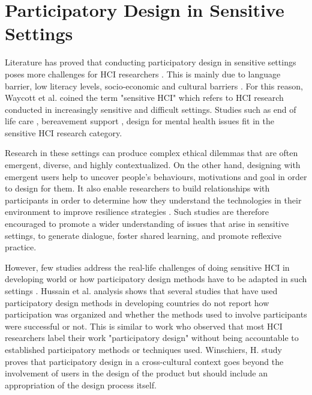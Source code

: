 \section{Participatory Design in Sensitive Settings}
Literature has proved that conducting participatory design in sensitive settings poses more challenges for HCI researchers \citep{Hussain2012, Wadley2016, Garzotto2008}. This is mainly due to language barrier, low literacy levels, socio-economic and cultural barriers \citep{Hussain2012}. For this reason, Waycott et al. \citep{Waycott2015} coined the term "sensitive HCI" which refers to HCI research conducted in increasingly sensitive and difficult settings. Studies such as end of life care \citep{Borgstrom2017a}, bereavement  support \citep{Massimi2013}, design for mental health issues \citep{Wilson2015,Thieme2013} fit in the sensitive HCI research category. 

Research in these settings can produce complex ethical dilemmas that are often emergent, diverse, and highly contextualized. On the other hand, designing with emergent users help to uncover people's behaviours, motivations and goal in order to design for them. It also enable researchers to build relationships with participants in order to determine how they understand the technologies in their environment to improve resilience strategies \citep{Garzotto2008}. Such studies are therefore encouraged to promote a wider understanding of issues that arise in sensitive settings, to generate dialogue, foster shared learning, and promote reflexive practice.

However, few studies address the real-life challenges of doing sensitive HCI in developing world or how participatory design methods have to be adapted in such settings \citep{Winschiers-Theophilus2010, Oyugi2008b}. Hussain et al. \citep{Hussain2012} analysis shows that several studies that have used participatory design methods in developing countries do not report how participation was organized and whether the methods used to involve participants were successful or not. This is similar to \citep{Spinuzzi2005} work who observed that most HCI researchers label their work "participatory design" without being accountable to established participatory methods or techniques used. Winschiers, H. \citep{Winschiers2006} study proves that participatory design in a cross-cultural context goes beyond the involvement of users in the design of the product but should include an appropriation of the design process itself. 

